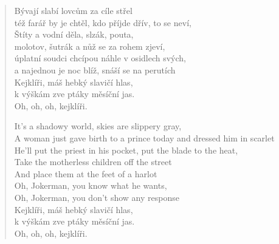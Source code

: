 \begin{verse}
Bývají slabí lovcům za cíle střel\\
též farář by je chtěl, kdo příjde dřív, to se neví, \\
Štíty a vodní děla, slzák, pouta, \\
molotov, šutrák a nůž se za rohem zjeví, \\
úplatní soudci chcípou náhle v osidlech svých, \\
a najednou je noc blíž, snáší se na perutích \\
Kejklíři, máš hebký slavičí hlas,\\
k výškám zve ptáky měsíční jas. \\
Oh, oh, oh, kejklíři.

It's a shadowy world, skies are slippery gray, \\
A woman just gave birth to a prince today and dressed him in scarlet \\
He'll put the priest in his pocket, put the blade to the heat, \\
Take the motherless children off the street \\
And place them at the feet of a harlot \\
Oh, Jokerman, you know what he wants, \\
Oh, Jokerman, you don't show any response \\
Kejklíři, máš hebký slavičí hlas,\\
k výškám zve ptáky měsíční jas. \\
Oh, oh, oh, kejklíři.
\end{verse}
